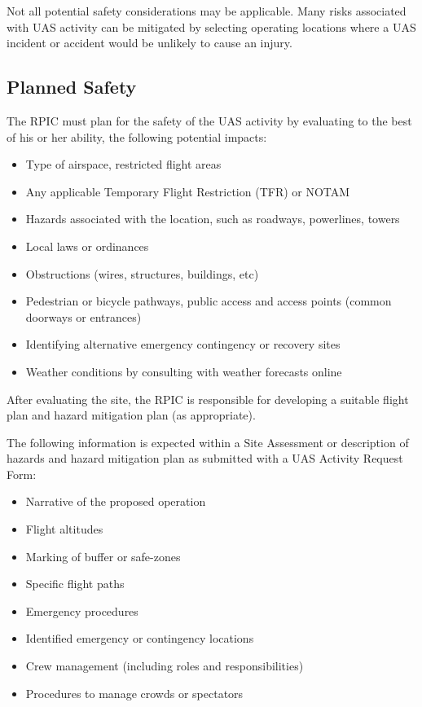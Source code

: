 \documentclass[
]{book}
\providecommand{\tightlist}{%
  \setlength{\itemsep}{0pt}\setlength{\parskip}{0pt}}
\begin{document}
Not all potential safety considerations may be applicable. Many risks associated with UAS activity can be mitigated by selecting operating locations where a UAS incident or accident would be unlikely to cause an injury.

\hypertarget{planned-safety}{%
\subsection{Planned Safety}\label{planned-safety}}

The RPIC must plan for the safety of the UAS activity by evaluating to the best of his or her ability, the following potential impacts:

\begin{itemize}
\tightlist
\item
  Type of airspace, restricted flight areas
\item
  Any applicable Temporary Flight Restriction (TFR) or NOTAM
\item
  Hazards associated with the location, such as roadways, powerlines, towers
\item
  Local laws or ordinances
\item
  Obstructions (wires, structures, buildings, etc)
\item
  Pedestrian or bicycle pathways, public access and access points (common doorways or entrances)
\item
  Identifying alternative emergency contingency or recovery sites
\item
  Weather conditions by consulting with weather forecasts online
\end{itemize}

After evaluating the site, the RPIC is responsible for developing a suitable flight plan and hazard mitigation plan (as appropriate).

The following information is expected within a Site Assessment or description of hazards and hazard mitigation plan as submitted with a UAS Activity Request Form:

\begin{itemize}
\tightlist
\item
  Narrative of the proposed operation
\item
  Flight altitudes
\item
  Marking of buffer or safe-zones
\item
  Specific flight paths
\item
  Emergency procedures
\item
  Identified emergency or contingency locations
\item
  Crew management (including roles and responsibilities)
\item
  Procedures to manage crowds or spectators
\end{itemize}
\end{document}
